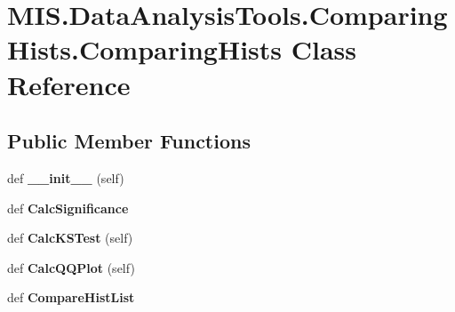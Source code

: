 \hypertarget{classMIS_1_1DataAnalysisTools_1_1ComparingHists_1_1ComparingHists}{}\section{M\+I\+S.\+Data\+Analysis\+Tools.\+Comparing\+Hists.\+Comparing\+Hists Class Reference}
\label{classMIS_1_1DataAnalysisTools_1_1ComparingHists_1_1ComparingHists}
\subsection*{Public Member Functions}
\begin{DoxyCompactItemize}
\item 
\mbox{\label{classMIS_1_1DataAnalysisTools_1_1ComparingHists_1_1ComparingHists_a7c39c9db1f94f75fa3a820624ebac44b}} 
def {\bfseries \+\_\+\+\_\+init\+\_\+\+\_\+} (self)
\item 
\mbox{\label{classMIS_1_1DataAnalysisTools_1_1ComparingHists_1_1ComparingHists_a7251e628e211b6083253c38030e9f10b}} 
def {\bfseries Calc\+Significance}
\item 
\mbox{\label{classMIS_1_1DataAnalysisTools_1_1ComparingHists_1_1ComparingHists_ac101b9e26f1d666c47b6fd4b5b270503}} 
def {\bfseries Calc\+K\+S\+Test} (self)
\item 
\mbox{\label{classMIS_1_1DataAnalysisTools_1_1ComparingHists_1_1ComparingHists_a7620eb81d7c00bbf0a8f99c86e14c025}} 
def {\bfseries Calc\+Q\+Q\+Plot} (self)
\item 
\mbox{\label{classMIS_1_1DataAnalysisTools_1_1ComparingHists_1_1ComparingHists_ab25bcf279bdb83898dbc53300df2b33f}} 
def {\bfseries Compare\+Hist\+List}
\item 
\mbox{\label{classMIS_1_1DataAnalysisTools_1_1ComparingHists_1_1ComparingHists_aafd7fc27334c3994fd024904c3e3053a}} 

\end{DoxyCompactItemize}
